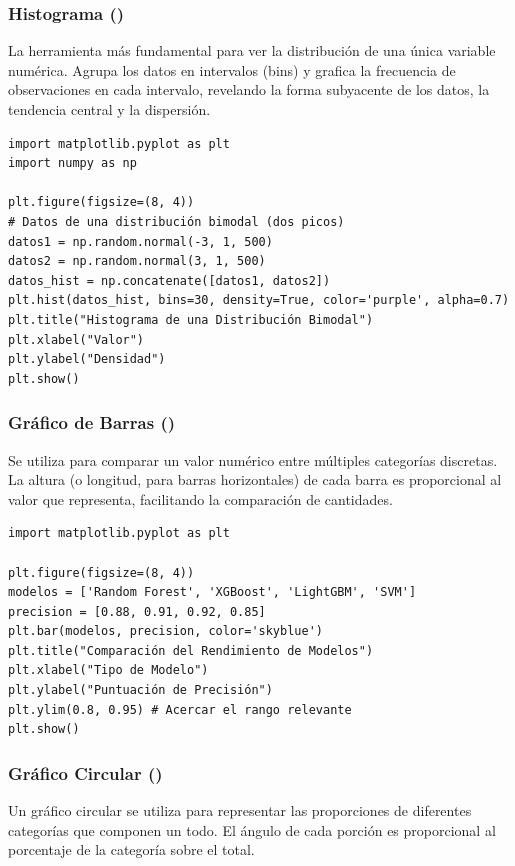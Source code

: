 \subsubsection*{Histograma ()}
La herramienta más fundamental para ver la distribución de una única variable numérica. Agrupa los datos en intervalos (bins) y grafica la frecuencia de observaciones en cada intervalo, revelando la forma subyacente de los datos, la tendencia central y la dispersión.

\begin{example}
\text{ }\begin{verbatim}
import matplotlib.pyplot as plt
import numpy as np

plt.figure(figsize=(8, 4))
# Datos de una distribución bimodal (dos picos)
datos1 = np.random.normal(-3, 1, 500)
datos2 = np.random.normal(3, 1, 500)
datos_hist = np.concatenate([datos1, datos2])
plt.hist(datos_hist, bins=30, density=True, color='purple', alpha=0.7)
plt.title("Histograma de una Distribución Bimodal")
plt.xlabel("Valor")
plt.ylabel("Densidad")
plt.show()
\end{verbatim}
\end{example}

\subsubsection*{Gráfico de Barras ()}
Se utiliza para comparar un valor numérico entre múltiples categorías discretas. La altura (o longitud, para barras horizontales) de cada barra es proporcional al valor que representa, facilitando la comparación de cantidades.

\begin{example}
\text{ }\begin{verbatim}
import matplotlib.pyplot as plt

plt.figure(figsize=(8, 4))
modelos = ['Random Forest', 'XGBoost', 'LightGBM', 'SVM']
precision = [0.88, 0.91, 0.92, 0.85]
plt.bar(modelos, precision, color='skyblue')
plt.title("Comparación del Rendimiento de Modelos")
plt.xlabel("Tipo de Modelo")
plt.ylabel("Puntuación de Precisión")
plt.ylim(0.8, 0.95) # Acercar el rango relevante
plt.show()
\end{verbatim}
\end{example}

\subsubsection*{Gráfico Circular ()}
Un gráfico circular se utiliza para representar las proporciones de diferentes categorías que componen un todo. El ángulo de cada porción es proporcional al porcentaje de la categoría sobre el total.

